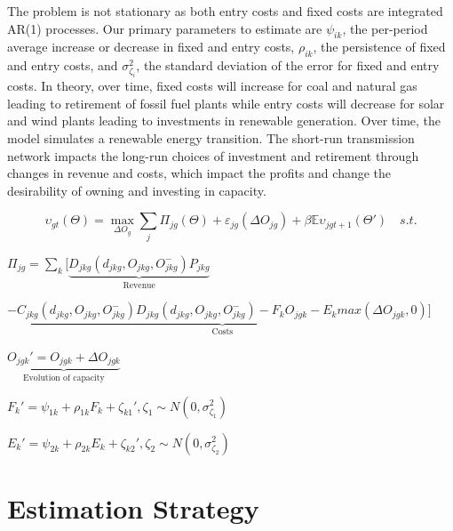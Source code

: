 \documentclass[12pt]{article}
\begin{document}
The problem is not stationary as both entry costs and fixed costs are integrated AR(1) processes. Our primary parameters to estimate are $\psi_{ik}$, the per-period average increase or decrease in fixed and entry costs, $\rho_{ik}$, the persistence of fixed and entry costs, and $\sigma^2_{\zeta_i}$, the standard deviation of the error for fixed and entry costs. In theory, over time, fixed costs will increase for coal and natural gas leading to retirement of fossil fuel plants while entry costs will decrease for solar and wind plants leading to investments in renewable generation. Over time, the model simulates a renewable energy transition. The short-run transmission network impacts the long-run choices of investment and retirement through changes in revenue and costs, which impact the profits and change the desirability of owning and investing in capacity.

 \begin{equation}\label{LongTermModel}
     \upsilon_{gt}(\Theta)=\max_{{\Delta O_{g}}} \sum_j \Pi_{jg}(\Theta)+\varepsilon_{jg}(\Delta O_{jg})+\beta  \mathbb{E}\upsilon_{jgt+1}(\Theta') \mspace{18mu} s.t.
\end{equation}
\begin{center}
$\Pi_{jg}=\sum_{k} [\underbrace{D_{jkg}(d_{jkg},O_{jkg},O_{jkg}^-)P_{jkg}}_\text{Revenue}$
 \end{center}
\begin{center}
    $-\underbrace{C_{jkg}(d_{jkg},O_{jkg},O_{jkg}^-)D_{jkg}(d_{jkg},O_{jkg},O_{jkg}^-)-F_{k} O_{jgk}-E_{k}max(\Delta O_{jgk},0)}_\text{Costs}]$
\end{center}
 \begin{center}
     $\underbrace{O_{jgk}'=O_{jgk}+\Delta O_{jgk}}_\text{Evolution of capacity}$
 \end{center}
 \begin{center}
     $F_{k}'=\psi_{1k}+\rho_{1k}F_{k}+\zeta_{k1}', \zeta_1 \sim N(0,\sigma^2_{\zeta_1})$
 \end{center}
 \begin{center}
     $E_{k}'=\psi_{2k}+\rho_{2k}E_{k}+\zeta_{k2}', \zeta_2 \sim N(0,\sigma^2_{\zeta_2})$
 \end{center}


\section{Estimation Strategy} \label{sec:Estimation}
\end{document}
